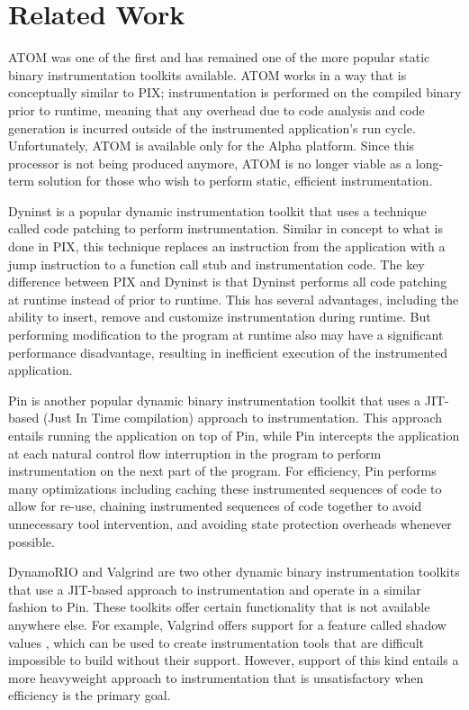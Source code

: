 \section{Related Work}
\label{sec:Related}

ATOM \cite{srivastava1994atom} was one of the first and has remained one of the more popular static binary instrumentation toolkits
available. ATOM works in a way that is conceptually similar to PIX; instrumentation is performed on the compiled
binary prior to runtime, meaning that any overhead due to code analysis and code generation is incurred outside of
the instrumented application's run cycle. Unfortunately, ATOM is available only for the Alpha platform. Since this
processor is not being produced anymore, ATOM is no longer viable as a long-term solution for those who wish to
perform static, efficient instrumentation. 

Dyninst \cite{buck2000api} is a popular dynamic instrumentation toolkit that uses a technique called code patching
to perform instrumentation. Similar in concept to what is done in PIX, this technique replaces an
instruction from the application with a jump instruction to a function call stub and
instrumentation code. The key difference between PIX and Dyninst is that Dyninst performs all code patching
at runtime instead of prior to runtime. This has several advantages, including the ability to insert, remove
and customize instrumentation during runtime. But performing modification to the program at runtime also
may have a significant performance disadvantage, resulting in inefficient execution of the instrumented application.

Pin \cite{luk2005pin} is another popular dynamic binary instrumentation toolkit that uses a JIT-based (Just In Time compilation) approach to
instrumentation. This approach entails running the application on top of Pin, while Pin intercepts the
application at each natural control flow interruption in the program to perform instrumentation on the next part of the
program. For efficiency, Pin performs many optimizations including caching these instrumented sequences of code to allow for
re-use, chaining instrumented sequences of code together to avoid unnecessary tool intervention, and avoiding state protection
overheads whenever possible.

DynamoRIO \cite{bruening2004efficient} and Valgrind \cite{nethercote2007valgrind} are two other dynamic
binary instrumentation toolkits that use a JIT-based approach to instrumentation and operate in a similar fashion
to Pin. These toolkits offer certain functionality that is not available anywhere else. For example, Valgrind offers
support for a feature called shadow values \cite{nethercote2007shadow}, 
which can be used to create instrumentation tools that are difficult impossible to build without
their support. However, support of this kind entails a more heavyweight approach to instrumentation that is
unsatisfactory when efficiency is the primary goal.
